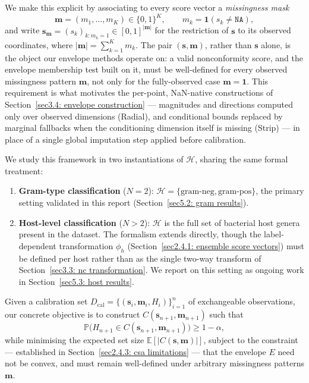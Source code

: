 \vspace{0.15cm}
\noindent We make this explicit by associating to every score vector a \emph{missingness mask}
\begin{equation*}
\mathbf{m} = (m_1, \ldots, m_K) \in \{0,1\}^K, \qquad m_k = \mathbf{1}(s_k \neq \texttt{NA}),
\end{equation*}
and write $\mathbf{s}_{\mathbf{m}} = (s_k)_{k : m_k = 1} \in [0,1]^{|\mathbf{m}|}$ for the restriction of $\mathbf{s}$ 
to its observed coordinates, where $|\mathbf{m}| = \sum_{k=1}^K m_k$. The pair $(\mathbf{s}, \mathbf{m})$, rather than 
$\mathbf{s}$ alone, is the object our envelope methods operate on: a valid nonconformity score, and the envelope 
membership test built on it, must be well-defined for every observed missingness pattern $\mathbf{m}$, not only for 
the fully-observed case $\mathbf{m} = \mathbf{1}$. This requirement is what motivates the per-point, NaN-native 
constructions of Section~\ref{sec3.4: envelope construction} — magnitudes and directions computed only over observed 
dimensions (Radial), and conditional bounds replaced by marginal fallbacks when the conditioning dimension itself is 
missing (Strip) — in place of a single global imputation step applied before calibration.

\vspace{0.15cm}
\noindent We study this framework in two instantiations of $\mathcal{H}$, sharing the same formal treatment:
\begin{enumerate}[label=(\roman*)]
    \item \textbf{Gram-type classification} ($N = 2$): $\mathcal{H} = \{\text{gram-neg}, \text{gram-pos}\}$, the 
          primary setting validated in this report (Section~\ref{sec5.2: gram results}).
    \item \textbf{Host-level classification} ($N > 2$): $\mathcal{H}$ is the full set of bacterial host genera present 
          in the dataset. The formalism extends directly, though the label-dependent transformation $\phi_h$ 
          (Section~\ref{sec2.4.1: ensemble score vectors}) must be defined per host rather than as the single 
          two-way transform of Section~\ref{sec3.3: nc transformation}. We report on this setting as ongoing work 
          in Section~\ref{sec5.3: host results}.
\end{enumerate}

\vspace{0.15cm}
\noindent Given a calibration set $D_{\text{cal}} = \{(\mathbf{s}_i, \mathbf{m}_i, H_i)\}_{i=1}^n$ of exchangeable 
observations, our concrete objective is to construct $C(\mathbf{s}_{n+1}, \mathbf{m}_{n+1})$ such that
\begin{equation*}
\mathbb{P}\big(H_{n+1} \in C(\mathbf{s}_{n+1}, \mathbf{m}_{n+1})\big) \ge 1-\alpha,
\end{equation*}
while minimising the expected set size $\mathbb{E}[|C(\mathbf{s}, \mathbf{m})|]$, subject to the constraint — 
established in Section~\ref{sec2.4.3: csa limitations} — that the envelope $E$ need not be convex, and must remain 
well-defined under arbitrary missingness patterns $\mathbf{m}$.